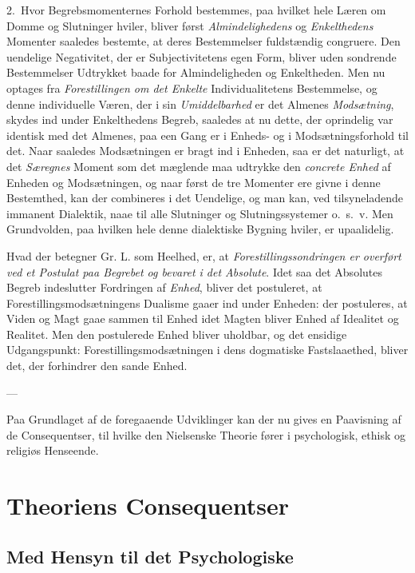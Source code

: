 \documentclass[12pt,a4paper]{book}
\newcommand{\opage}[1]{\marginnote{\footnotesize\textit{[#1]}}}
\begin{document}
\opage{177}2.~Hvor Begrebsmomenternes Forhold bestemmes, paa hvilket hele Læren om Domme og Slutninger
hviler, bliver først \emph{Almindelighedens} og \emph{Enkelthedens} Momenter saaledes bestemte, at
deres Bestemmelser fuldstændig congruere. Den uendelige Negativitet, der er Subjectivitetens
egen Form, bliver uden sondrende Bestemmelser Udtrykket baade for Almindeligheden og
Enkeltheden. Men nu optages fra \emph{Forestillingen om det Enkelte} Individualitetens Bestemmelse, og denne individuelle Væren, der i sin \emph{Umiddelbarhed} er det Almenes \emph{Modsætning},
skydes ind under Enkelthedens Begreb, saaledes at nu dette, der oprindelig var identisk med
det Almenes, paa een Gang er i Enheds- og i Modsætningsforhold til det. Naar saaledes
Modsætningen er bragt ind i Enheden, saa er det naturligt, at det \emph{Særegnes} Moment som
det mæglende maa udtrykke den \emph{concrete Enhed} af Enheden og Modsætningen, og naar først de tre
Momenter ere givne i denne Bestemthed, kan der combineres i det Uendelige, og man kan, ved
tilsyneladende immanent Dialektik, naae til alle Slutninger og Slutningssystemer o.\ s.\ v.
Men Grundvolden, paa hvilken hele denne dialektiske Bygning hviler, er upaalidelig.

Hvad der betegner Gr. L. som Heelhed, er, at \emph{Forestillingssondringen er overført ved et
Postulat paa Begrebet og bevaret i det Absolute}. Idet saa det Absolutes Begreb indeslutter Fordringen af \emph{Enhed}, bliver det postuleret, at Forestillingsmodsætningens Dualisme gaaer ind
under Enheden: der postuleres, at Viden og Magt gaae sammen til Enhed idet Magten bliver
Enhed af Idealitet og Realitet. Men den postulerede Enhed bliver uholdbar, og det ensidige
Udgangspunkt: Forestillingsmodsætningen i dens dogmatiske Fastslaaethed, bliver det, der
forhindrer den sande Enhed.

\begin{center}---\end{center}

Paa Grundlaget af de foregaaende Udviklinger kan der nu gives en Paavisning af de
Consequentser, til hvilke \opage{178}den Nielsenske Theorie fører i psychologisk, ethisk og religiøs
Henseende.

\section{Theoriens Consequentser}
\label{sec:consequentser}

\subsection{Med Hensyn til det Psychologiske}
\label{ssec:conseq-psych}
\end{document}
